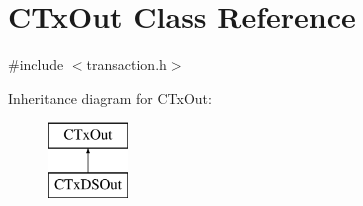 \hypertarget{class_c_tx_out}{}\section{C\+Tx\+Out Class Reference}
\label{class_c_tx_out}


{\ttfamily \#include $<$transaction.\+h$>$}

Inheritance diagram for C\+Tx\+Out\+:\begin{figure}[H]
\begin{center}
\leavevmode
\includegraphics[height=2.000000cm]{class_c_tx_out}
\end{center}
\end{figure}
